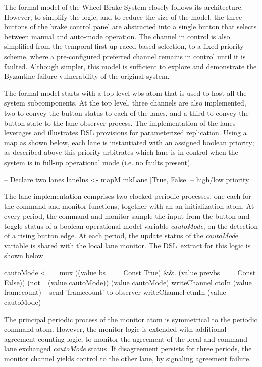 

The formal model  of the  Wheel Brake System closely follows its architecture.
However, to simplify the logic, and to reduce the size of the model, the
three buttons of the brake control panel are abstracted into a single button
that selects between manual and auto-mode operation.  The channel in control
is also simplified from the temporal first-up raced based selection, to a  fixed-priority scheme, where a pre-configured preferred channel remains in control
until it is faulted. Although simpler, this model is sufficient to explore and demonstrate the Byzantine failure vulnerability of the original system. 

The formal model starts with a top-level wbs atom that is used
to host all the system subcomponents. At the top level, three channels
are also implemented, two to convey the button status to each of the lanes,
and a third to convey the button state to the lane observer process.
The   implementation of the lanes leverages and illustrates DSL provisions for parameterized replication.
 Using a map as shown below,  each lane is instantiated with an assigned boolean  priority;  as described above   this priority arbitrates which lane is in control when the system is in full-up operational mode (i.e. no faults present).

\begin{lima}
 -- Declare two lanes
  laneIns <- mapM mkLane [True, False]  -- high/low priority
\end{lima}

 The lane implementation comprises two clocked periodic processes, one each for the  command and monitor  functions, together with an  an initialization  atom. At every period, the command and monitor sample the input from the button and toggle status of a boolean  operational model variable \textit{cautoMode},  on the detection of a rising button edge.  At each period, the update status of the \textit{cautoMod}e variable is shared with the local lane monitor.
 The DSL\ extract for this logic is shown below.



\begin{lima}

   cautoMode <== mux ((value bs ==. Const True) &&.
                       (value prevbs ==. Const False))
                      (not_ (value cautoMode))
                      (value cautoMode)
    writeChannel ctoIn (value framecount)  -- send 'framecount' to observer
    writeChannel ctmIn (value cautoMode)
      
\end{lima}
  The principal periodic process of the monitor atom is symmetrical to the periodic command atom. However, the monitor logic is extended with additional agreement counting logic, to monitor the agreement of the local and  command lane exchanged   \emph{cautoMode}  status. If disagreement persists   for three periods, the  monitor channel yields control to the other lane, by signaling  agreement failure.  

